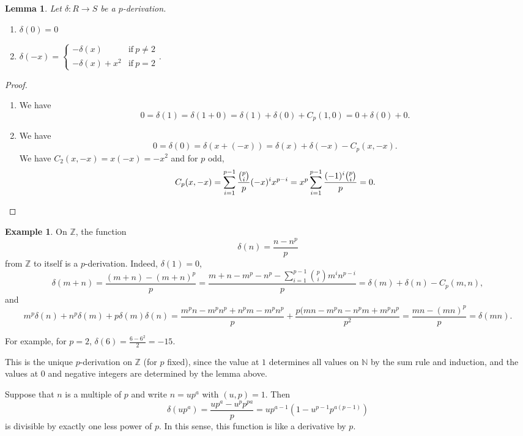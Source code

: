 \documentclass{amsart}[12pt]
\newcommand{\Z}{\mathbb{Z}}
\newcommand{\N}{\mathbb{N}}
\numberwithin{equation}{section}
\theoremstyle{plain} %
\newtheorem{lem}[equation]{Lemma}
\theoremstyle{definition}
\newtheorem{ex}[equation]{Example}
\theoremstyle{remark}
\begin{document}
\begin{lem} Let $\delta:R\to S$ be a $p$-derivation.
\begin{enumerate}
\item $\delta(0)=0$
\item $\delta(-x) = \begin{cases} -\delta(x) & \text{if} \ p\neq 2 \\ -\delta(x) + x^2 & \text{if} \ p= 2  \end{cases}$.
\end{enumerate}
\end{lem}
\begin{proof}
\begin{enumerate}
\item We have
\[ 0 = \delta(1) = \delta(1+0) = \delta(1) + \delta(0) + C_p(1,0) = 0 + \delta(0) + 0.\]
\item We have
 \[ 0 = \delta(0) = \delta( x + (-x) ) = \delta(x) + \delta(-x) - C_p(x,-x).\]
 We have $C_2(x,-x) = x(-x) = -x^2$ and for $p$ odd, 
 \[ C_p(x,-x) = \sum_{i=1}^{p-1} \frac{\binom{p}{i}}{p} (-x)^i x^{p-i} = x^p \sum_{i=1}^{p-1} \frac{(-1)^i \binom{p}{i}}{p}  = 0.\qedhere \]
 \end{enumerate}
 \end{proof}

\begin{ex} On $\Z$, the function 
\[  \delta(n) = \frac{n-n^p}{p}\]
from $\Z$ to itself is a $p$-derivation. Indeed, $\delta(1)=0$, 
\[ \delta(m+n) = \frac{(m+n)-(m+n)^p}{p} = \frac{ m + n - m^p - n^p - \sum_{i=1}^{p-1} \binom{p}{i} m^i n^{p-i}}{p} = \delta(m) + \delta(n) - C_p(m,n),\]
and
\[ m^p \delta(n) + n^p \delta(m) + p\delta(m)\delta(n) = \frac{m^p n - m^p n^p + n^p m -m^p n^p}{p} + \frac{p (m n - m^p n - n^p m + m^p n^p}{p^2} = \frac{mn - (mn)^p}{p}= \delta(mn).\]

For example, for $p=2$, $\delta(6) = \frac{6-6^2}{2} =  -15$.

This is the unique $p$-derivation on $\Z$ (for $p$ fixed), since the value at $1$ determines all values on $\N$ by the sum rule and induction, and the values at $0$ and negative integers are determined by the lemma above. 

Suppose that $n$ is a multiple of $p$ and write $n= u p^a$ with $(u,p)=1$. Then
\[ \delta(u p^a) = \frac{ u p^a - u^p p^{pa}}{p} =  u p^{a-1} ( 1- u^{p-1} p^{a(p-1)})\] 
is divisible by exactly one less power of $p$. In this sense, this function is like a derivative by $p$.
\end{ex}
\end{document}
